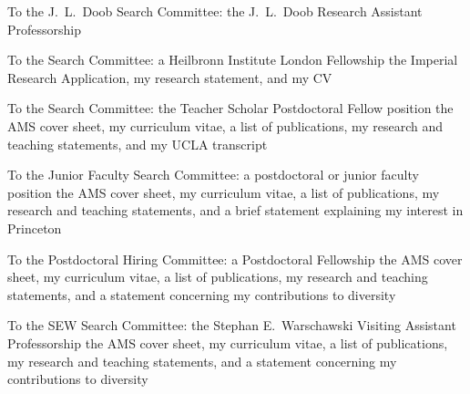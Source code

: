 \documentclass[11pt]{letter}
\begin{document}





\coverletter
  {\uiuc}
  {To the J.~L.~Doob Search Committee:}
  {the J.~L.~Doob Research Assistant Professorship}
  {\mathjobs}
  {}
  {}
  {\generic}


\coverletter
	{\imperial}
	{To the Search Committee:}
	{a Heilbronn Institute London Fellowship}
	{\website}
	{}
	{}
	{the Imperial Research Application, my research statement, and my CV}

\coverletter
  {\wakeforest}
  {To the Search Committee:}
  {the Teacher Scholar Postdoctoral Fellow position}
  {\mathjobs}
  {}
  {}
  {the AMS cover sheet, my curriculum vitae, a list of publications, my research and teaching statements, and my UCLA transcript}

\coverletter
  {\princeton}
  {To the Junior Faculty Search Committee:}
  {a postdoctoral or junior faculty position}
  {\mathjobs}
  {}
  {}
  {the AMS cover sheet, my curriculum vitae, a list of publications, my research and teaching statements, and a brief statement explaining my interest in Princeton}

\coverletter
  {\uconn}
  {To the Postdoctoral Hiring Committee:}
  {a Postdoctoral Fellowship}
  {\mathjobs}
  {}
  {}
  {the AMS cover sheet, my curriculum vitae, a list of publications, my research and teaching statements, and a statement concerning my contributions to diversity}

\coverletter
	{\ucsd}
	{To the SEW Search Committee:}
	{the Stephan E.~Warschawski Visiting Assistant Professorship}
	{\mathjobs}
	{}
	{}
	{the AMS cover sheet, my curriculum vitae, a list of publications, my research and teaching statements, and a statement concerning my contributions to diversity}
\end{document}
